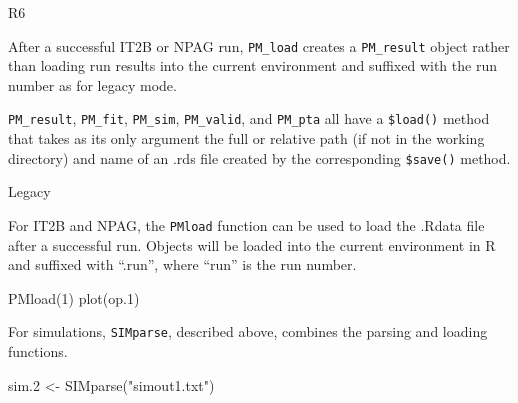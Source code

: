 \documentclass[
]{book}
\newenvironment{Shaded}{\begin{snugshade}}{\end{snugshade}}
\newcommand{\DecValTok}[1]{\textcolor[rgb]{0.00,0.00,0.81}{#1}}
\newcommand{\FloatTok}[1]{\textcolor[rgb]{0.00,0.00,0.81}{#1}}
\newcommand{\FunctionTok}[1]{\textcolor[rgb]{0.00,0.00,0.00}{#1}}
\newcommand{\NormalTok}[1]{#1}
\newcommand{\OtherTok}[1]{\textcolor[rgb]{0.56,0.35,0.01}{#1}}
\newcommand{\SpecialCharTok}[1]{\textcolor[rgb]{0.00,0.00,0.00}{#1}}
\newcommand{\StringTok}[1]{\textcolor[rgb]{0.31,0.60,0.02}{#1}}
\begin{document}
{R6}

After a successful IT2B or NPAG run, \texttt{PM\_load} creates a
\texttt{PM\_result} object rather than loading run results into the current
environment and suffixed with the run number as for legacy mode.

\begin{Shaded}
\end{Shaded}

\texttt{PM\_result}, \texttt{PM\_fit}, \texttt{PM\_sim}, \texttt{PM\_valid}, and
\texttt{PM\_pta} all have a \texttt{\$load()} method that takes as its only argument the
full or relative path (if not
in the working directory) and name of an .rds file created by the corresponding
\texttt{\$save()} method.

\begin{Shaded}
\end{Shaded}

{Legacy}

For IT2B and NPAG, the \texttt{PMload} function can be used to load the .Rdata file
after a successful run. Objects will be loaded
into the current environment in R and suffixed with ``.run'', where ``run'' is
the run number.

\begin{Shaded}
\begin{Highlighting}[]
\FunctionTok{PMload}\NormalTok{(}\DecValTok{1}\NormalTok{)}
\FunctionTok{plot}\NormalTok{(op}\FloatTok{.1}\NormalTok{)}
\end{Highlighting}
\end{Shaded}

For simulations, \texttt{SIMparse}, described above, combines the parsing and loading
functions.

\begin{Shaded}
\begin{Highlighting}[]
\NormalTok{sim}\FloatTok{.2} \OtherTok{\textless{}{-}} \FunctionTok{SIMparse}\NormalTok{(}\StringTok{"simout1.txt"}\NormalTok{)}
\end{Highlighting}
\end{Shaded}
\end{document}
